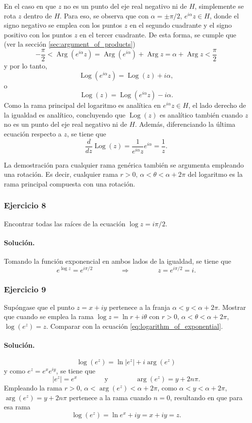 \documentclass[a4paper]{report}
\DeclareMathOperator{\Arg}{Arg}
\DeclareMathOperator{\Log}{Log}
\begin{document}
En el caso en que \(z\) no es un punto del eje real negativo ni de \(H\), simplemente se rota \(z\) dentro de \(H\). Para eso, se observa que con \(\alpha=\pm\pi/2\), \(e^{i\alpha}z\in H\), donde el signo negativo se emplea con los puntos \(z\) en el segundo cuadrante y el signo positivo con los puntos \(z\) en el tercer cuadrante. De esta forma, se cumple que (ver la sección \ref{sec:argument_of_products}) 
\[
 -\frac{\pi}{2}<\Arg(e^{i\alpha}z)=\Arg(e^{i\alpha})+\Arg z=\alpha+\Arg z<\frac{\pi}{2}
\]
y por lo tanto,
\[
 \Log(e^{i\alpha}z)=\Log(z)+i\alpha,
\]
o
\[
 \Log(z)=\Log(e^{i\alpha}z)-i\alpha.
\]
Como la rama principal del logaritmo es analítica en  \(e^{i\alpha}z\in H\), el lado derecho de la igualdad es analítico, concluyendo que \(\Log(z)\) es analítico también cuando \(z\) no es un punto del eje real negativo ni de \(H\). Además, diferenciando la última ecuación respecto a \(z\), se tiene que  
\[
 \frac{d}{dz}\Log(z)=\frac{1}{e^{i\alpha}z}e^{i\alpha}=\frac{1}{z}.
\]

La demostración para cualquier rama genérica también se argumenta empleando una rotación. Es decir, cualquier rama \(r>0,\,\alpha<\theta<\alpha+2\pi\) del logaritmo es la rama principal compuesta con una rotación.

\subsubsection{Ejercicio 8}

Encontrar todas las raíces de la ecuación \(\log z=i\pi/2\).

\paragraph{Solución.} Tomando la función exponencial en ambos lados de la igualdad, se tiene que 
\[
 e^{\log z}=e^{i\pi/2}
 \qquad\qquad\Rightarrow\qquad\qquad
 z=e^{i\pi/2}=i.
\]

\subsubsection{Ejercicio 9}

Supóngase que el punto \(z=x+iy\) pertenece a la franja \(\alpha<y<\alpha+2\pi\). Mostrar que cuando se emplea la rama \(\log z=\ln r+i\theta\) con \(r>0,\,\alpha<\theta<\alpha+2\pi\), \(\log(e^z)=z\). Comparar con la ecuación \ref{eq:logarithm_of_exponential}.

\paragraph{Solución.}
\[
 \log(e^z)=\ln|e^z|+i\arg(e^z)
\]
y como \(e^z=e^xe^{iy}\), se tiene que
\[
 |e^z|=e^x
 \qquad\qquad\textrm{y}\qquad\qquad
 \arg(e^z)=y+2n\pi.
\]
Empleando la rama \(r>0,\,\alpha<\arg(e^z)<\alpha+2\pi\), como \(\alpha<y<\alpha+2\pi\), \(\arg(e^z)=y+2n\pi\) pertenece a la rama cuando \(n=0\), resultando en que para esa rama
\[
 \log(e^z)=\ln e^x+iy=x+iy=z.
\]
\end{document}
